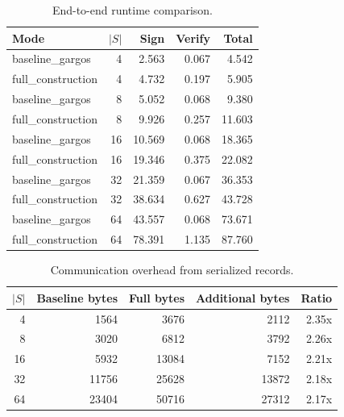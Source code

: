 \begin{table}[t]
\centering
\caption{End-to-end runtime comparison.}
\label{tab:new-runtime}
\small
\begin{tabular}{lrrrr}
\toprule
Mode & $|S|$ & Sign & Verify & Total \\
\midrule
baseline\_gargos & 4 & 2.563 & 0.067 & 4.542 \\
full\_construction & 4 & 4.732 & 0.197 & 5.905 \\
baseline\_gargos & 8 & 5.052 & 0.068 & 9.380 \\
full\_construction & 8 & 9.926 & 0.257 & 11.603 \\
baseline\_gargos & 16 & 10.569 & 0.068 & 18.365 \\
full\_construction & 16 & 19.346 & 0.375 & 22.082 \\
baseline\_gargos & 32 & 21.359 & 0.067 & 36.353 \\
full\_construction & 32 & 38.634 & 0.627 & 43.728 \\
baseline\_gargos & 64 & 43.557 & 0.068 & 73.671 \\
full\_construction & 64 & 78.391 & 1.135 & 87.760 \\
\bottomrule
\end{tabular}
\end{table}

\begin{table}[t]
\centering
\caption{Communication overhead from serialized records.}
\label{tab:new-communication}
\small
\begin{tabular}{rrrrr}
\toprule
$|S|$ & Baseline bytes & Full bytes & Additional bytes & Ratio \\
\midrule
4 & 1564 & 3676 & 2112 & 2.35x \\
8 & 3020 & 6812 & 3792 & 2.26x \\
16 & 5932 & 13084 & 7152 & 2.21x \\
32 & 11756 & 25628 & 13872 & 2.18x \\
64 & 23404 & 50716 & 27312 & 2.17x \\
\bottomrule
\end{tabular}
\end{table}
